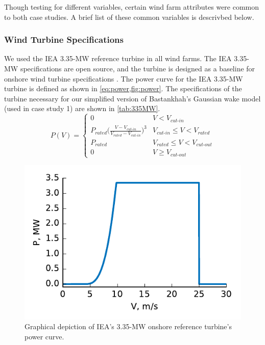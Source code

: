 Though testing for different variables, certain wind farm attributes were common to both case studies.
A brief list of these common variables is descrivbed below.

\subsubsection{Wind Turbine Specifications} \label{sec:turb}
	We used the IEA 3.35-MW reference turbine in all wind farms. The IEA 3.35-MW specifications are open source, and the turbine is designed as a baseline for onshore wind turbine specifications \cite{NREL335MW}. The power curve for the IEA 3.35-MW turbine is defined as shown in \cref{eq:power,fig:power}.
	The specifications of the turbine necessary for our simplified version of Bastankhah's Gaussian wake model (used in case study 1) are shown in \cref{tab:335MW}.  %
	\begin{equation}\label{eq:power}
		P(V) = 
		\begin{cases} 
			0 & V < V_{\textit{cut-in}} \\
			P_{\textit{rated}}\bigg(\frac{V-V_{\textit{cut-in}}}{V_{\textit{rated}}-V_{\textit{cut-in}}}\bigg)^3 & V_{\textit{cut-in}}\leq V < V_{\textit{rated}} \\
			P_{\textit{rated}} & V_{\textit{rated}} \leq V < V_{\textit{cut-out}} \\
			0 & V \geq V_{\textit{cut-out}}
		\end{cases}
	\end{equation}
	\begin{figure}[H]
	    \centering
	   \includegraphics[]{./figures/power_curve.pdf}
	    \caption{Graphical depiction of IEA's 3.35-MW onshore reference turbine's power curve.}
	    \label{fig:power}
	\end{figure}
